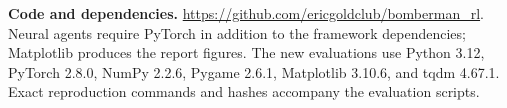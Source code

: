 {\small\textbf{Code and dependencies.}
\url{https://github.com/ericgoldclub/bomberman_rl}.
Neural agents require PyTorch in addition to the framework dependencies;
Matplotlib produces the report figures. The new evaluations use Python 3.12,
PyTorch 2.8.0, NumPy 2.2.6, Pygame 2.6.1, Matplotlib 3.10.6, and tqdm 4.67.1.
Exact reproduction commands and hashes accompany the evaluation scripts.\par}
